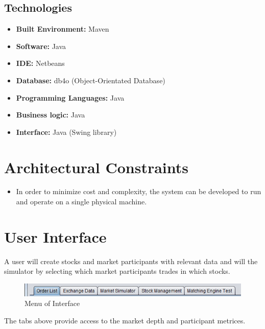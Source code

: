 \documentclass[12pt]{article}
\begin{document}
                \subsection{Technologies}
                    \begin{itemize}
                        \item \textbf{Built Environment:} Maven
                        \item \textbf{Software:} Java
                        \item \textbf{IDE:} Netbeans
                        \item \textbf{Database:} db4o (Object-Orientated Database)
                        \item \textbf{Programming Languages:} Java
                        \item \textbf{Business logic:} Java
                        \item \textbf{Interface:} Java (Swing library)
                    \end{itemize}

		\section{Architectural Constraints}
		\begin{itemize}
		\item In order to minimize cost and complexity, the system can be developed to run and operate on a single physical machine. 
		\end{itemize}

        \newpage
	\section{User Interface}
            A user will create stocks and market participants with relevant data and 
            will the simulator by selecting which market participants trades in which stocks.\\

            \begin{figure}[th]
             \centering
             \includegraphics[scale=0.8]{./menu}
             \caption{Menu of Interface}
             \label{Menu}
            \end{figure}
            The tabs above provide access to the market depth and participant metrices.
            
\end{document}
